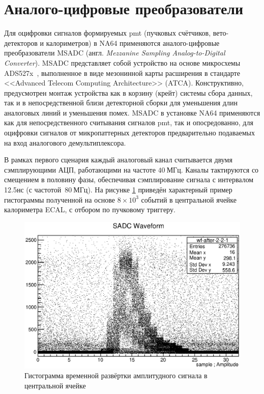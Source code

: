 \section{Аналого-цифровые преобразователи}

Для оцифровки сигналов формируемых \acrshort{pmt} (пучковых счётчиков,
вето-детекторов и калориметров) в NA64 применяются
аналого-цифровые преобразователи MSADC \cite{MSADC-Mann1, MSADC-Mann2}
(англ. \emph{Mezzanine Sampling Analog-to-Digital Converter}).
MSADC представляет собой устройство на основе микросхемы
ADS527x~\cite{ADS527x}, выполненное в виде мезонинной карты расширения
в стандарте <<Advanced Telecom Computing Architecture>> (ATCA).
Конструктивно, предусмотрен монтаж устройства как в
корзину (крейт) системы сбора данных, так и в непосредственной близи
детекторной сборки для уменьшения длин аналоговых линий и уменьшения помех.
MSADC в установке NA64 применяются как для непосредственного считывания
сигналов \acrshort{pmt}, так и опосредованно, для оцифровки сигналов
от микропаттерных детекторов предварительно подаваемых на вход
аналогового демультиплексора.

В рамках первого сценария каждый аналоговый канал считывается двумя сэмплирующими
АЦП, работающими на частоте $40~\text{МГц}$. Каналы тактируются со
смещением в половину
фазы, обеспечивая сэмплирование сигнала с интервалом 12.5нс (с
частотой~$80~\text{МГц}$). На рисунке \ref{fig:msadc-example} приведён
характерный пример гистограммы полученной на основе $8\times10^3$ событий в
центральной ячейке калориметра ECAL, с отбором по пучковому триггеру.

\begin{figure}
    \centering
    \includegraphics[width=0.65\linewidth]{images/illustrative/msadc-waveforms-example.eps}
    \caption{Гистограмма временной развёртки амплитудного сигнала в
    центральной ячейке}
    \label{fig:msadc-example}
\end{figure}


